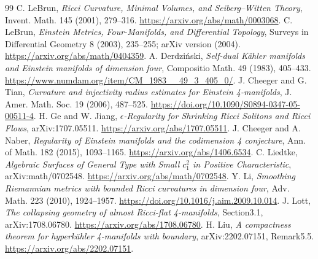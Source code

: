 \documentclass[UTF8,fontset=fandol,zihao=-4]{ctexart}
\theoremstyle{cn}
\numberwithin{equation}{section}
\begin{document}
\begin{thebibliography}{99}
C. LeBrun, \emph{Ricci Curvature, Minimal Volumes, and Seiberg--Witten Theory}, Invent. Math. 145 (2001), 279--316.
\url{https://arxiv.org/abs/math/0003068}.
C. LeBrun, \emph{Einstein Metrics, Four-Manifolds, and Differential Topology}, Surveys in Differential Geometry 8 (2003), 235--255; arXiv version (2004).
\url{https://arxiv.org/abs/math/0404359}.
A. Derdziński, \emph{Self-dual Kähler manifolds and Einstein manifolds of dimension four}, Compositio Math. 49 (1983), 405--433.
\url{https://www.numdam.org/item/CM_1983__49_3_405_0/}.
J. Cheeger and G. Tian, \emph{Curvature and injectivity radius estimates for Einstein 4-manifolds}, J. Amer. Math. Soc. 19 (2006), 487--525.
\url{https://doi.org/10.1090/S0894-0347-05-00511-4}.
H. Ge and W. Jiang, \emph{$\epsilon$-Regularity for Shrinking Ricci Solitons and Ricci Flows}, arXiv:1707.05511.
\url{https://arxiv.org/abs/1707.05511}.
J. Cheeger and A. Naber, \emph{Regularity of Einstein manifolds and the codimension 4 conjecture}, Ann. of Math. 182 (2015), 1093--1165.
\url{https://arxiv.org/abs/1406.6534}.
C. Liedtke, \emph{Algebraic Surfaces of General Type with Small $c_1^2$ in Positive Characteristic}, arXiv:math/0702548.
\url{https://arxiv.org/abs/math/0702548}.
Y. Li, \emph{Smoothing Riemannian metrics with bounded Ricci curvatures in dimension four}, Adv. Math. 223 (2010), 1924--1957.
\url{https://doi.org/10.1016/j.aim.2009.10.014}.
J. Lott, \emph{The collapsing geometry of almost Ricci-flat 4-manifolds}, Section3.1, arXiv:1708.06780.
\url{https://arxiv.org/abs/1708.06780}.
H. Liu, \emph{A compactness theorem for hyperkähler 4-manifolds with boundary}, arXiv:2202.07151, Remark5.5.
\url{https://arxiv.org/abs/2202.07151}.
\end{thebibliography}
\end{document}
